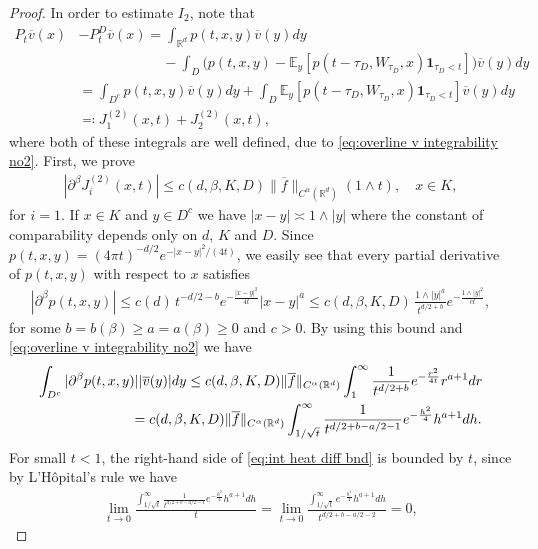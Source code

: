\documentclass[12pt,a4paper,onecolumn]{amsart}
\theoremstyle{definition}
\newcommand{\R}{\mathbb{R}}
\newcommand{\ex}{\mathbb{E}}
\newcommand{\1}{\mathbf 1}
\numberwithin{equation}{section}
\begin{document}
\begin{proof}
In order to estimate $I_2$, note that
 \begin{align*}
		P_t\overline v(x)&-P^D_t\overline v(x)=\int_{\R^d}p(t,x,y)\overline v(y)dy\\
		&\qquad\qquad\qquad-\int_{D}\big(p(t,x,y)-\ex_y\left[p(t-\tau_D,W_{\tau_D},x)\1_{\tau_D<t}\right]\big)\overline v(y)dy\\
		&=\int_{D^c}p(t,x,y)\overline v(y)dy+\int_D\ex_y\left[p(t-\tau_D,W_{\tau_D},x)\1_{\tau_D<t}\right]\overline v(y)dy\\
		&\eqqcolon J^{(2)}_1(x,t)+J_2^{(2)}(x,t),
	\end{align*}
where both of these integrals are well defined, due to \eqref{eq:overline v integrability no2}. First, we prove
\begin{align}\label{eq:J1 smooth}
    |\partial^\beta J^{(2)}_i(x,t)|\le c(d,\beta,K,D)\|\overline f\|_{C^\alpha(\R^d)}(1\wedge t),\quad x\in K,
\end{align}
for $i=1$. If $x\in K$ and $y \in D^c$ we have $|x-y|\asymp 1\wedge |y|$ where the constant of comparability depends only on $d$, $K$ and $D$. Since $p(t,x,y)=(4\pi t)^{-d/2}e^{-|x-y|^2/(4t)}$, we easily see that every partial derivative of $p(t,x,y)$ with respect to $x$ satisfies
\begin{align*}
	|\partial^\beta p(t,x,y)|\le c(d)\,t^{-d/2-b}e^{-\frac{|x-y|^2}{4t}}|x-y|^a\le c(d,\beta,K,D)\,\frac{1\wedge |y|^a}{t^{d/2+b}}e^{-\frac{1\wedge |y|^2}{ct}},
\end{align*} 
for some $b=b(\beta)\ge a=a(\beta)\ge 0$ and $c>0$. 
By using this bound and \eqref{eq:overline v integrability no2} we have
\begin{align}
    \int_{D^c} |\partial^\beta p(t,x,y)||\overline v(y)|dy&\le c(d,\beta,K,D)\|\overline f\|_{C^\alpha(\R^d)}\int_1^\infty \frac{1}{t^{d/2+b}}e^{-\frac{r^2}{4t}}r^{a+1}dr\nonumber\\
    &\hspace{-4em}=c(d,\beta,K,D)\|\overline f\|_{C^\alpha(\R^d)}\int_{1/\sqrt{t}}^\infty \frac{1}{t^{d/2+b-a/2-1}}e^{-\frac{h^2}{4}}h^{a+1}dh.\label{eq:int heat diff bnd}
\end{align}
For small $t<1$, the right-hand side of \eqref{eq:int heat diff bnd} is bounded by $t$, since by L'H\^{o}pital's rule we have
\begin{align*}
    \lim_{t\to 0}\frac{\displaystyle \int_{1/\sqrt{t}}^\infty \frac{1}{t^{d/2+b-a/2-1}}e^{-\frac{h^2}{4}}h^{a+1}dh}{t}=\lim_{t\to 0}\frac{\displaystyle \int_{1/\sqrt{t}}^\infty e^{-\frac{h^2}{4}}h^{a+1}dh}{t^{d/2+b-a/2-2}}=0,

\end{align*}
\end{proof}
\end{document}
